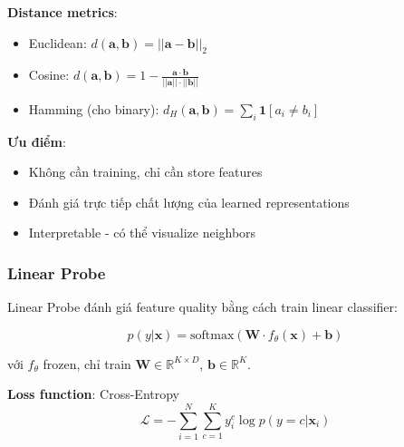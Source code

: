 \documentclass[12pt,a4paper]{article}
\begin{document}
\textbf{Distance metrics}:
\begin{itemize}
    \item Euclidean: $d(\mathbf{a}, \mathbf{b}) = ||\mathbf{a} - \mathbf{b}||_2$
    \item Cosine: $d(\mathbf{a}, \mathbf{b}) = 1 - \frac{\mathbf{a} \cdot \mathbf{b}}{||\mathbf{a}|| \cdot ||\mathbf{b}||}$
    \item Hamming (cho binary): $d_H(\mathbf{a}, \mathbf{b}) = \sum_i \mathbf{1}[a_i \neq b_i]$
\end{itemize}

\textbf{Ưu điểm}:
\begin{itemize}
    \item Không cần training, chỉ cần store features
    \item Đánh giá trực tiếp chất lượng của learned representations
    \item Interpretable - có thể visualize neighbors
\end{itemize}

\subsubsection{Linear Probe}

Linear Probe đánh giá feature quality bằng cách train linear classifier:

\begin{equation}
    p(y|\mathbf{x}) = \text{softmax}(\mathbf{W} \cdot f_\theta(\mathbf{x}) + \mathbf{b})
\end{equation}

với $f_\theta$ frozen, chỉ train $\mathbf{W} \in \mathbb{R}^{K \times D}$, $\mathbf{b} \in \mathbb{R}^K$.

\textbf{Loss function}: Cross-Entropy
\begin{equation}
    \mathcal{L} = -\sum_{i=1}^N \sum_{c=1}^K y_i^c \log p(y=c|\mathbf{x}_i)
\end{equation}
\end{document}
